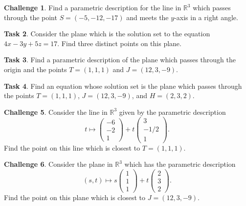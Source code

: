 \documentclass{tufte-book}
\theoremstyle{definition}
\newtheorem{task}{Task}
\newtheorem{challenge}[task]{Challenge}
\begin{document}
\begin{challenge}
Find a parametric description for the line in $\mathbb{R}^3$ which passes through the point $S = (-5,-12,-17)$ and meets the $y$-axis in a right angle.
\end{challenge}

\begin{task}
Consider the plane which is the solution set to the equation
$4x-3y+5z=17$. Find three distinct points on this plane.
\end{task}


\begin{task}
Find a parametric description of the plane which passes through the origin and the points $T = (1,1,1)$ and $J = (12,3,-9)$.
\end{task}


\begin{task}
Find an equation whose solution set is the plane which passes through the points $T = (1,1,1)$, $J = (12,3,-9)$, and $H = (2,3,2)$.
\end{task}


\begin{challenge}
Consider the line in $\mathbb{R}^3$ given by the parametric description
\[
t \mapsto \begin{pmatrix} -6\\-2\\1 \end{pmatrix} + t \begin{pmatrix} 3\\-1/2\\1\end{pmatrix}.
\]
Find the point on this line which is closest to $T = (1,1,1)$.
\end{challenge}


\begin{challenge}
Consider the plane in $\mathbb{R}^3$ which has the parametric description
\[
(s,t) \mapsto s\begin{pmatrix} 1\\1\\1\end{pmatrix} + t \begin{pmatrix} 2\\3\\2\end{pmatrix}. 
\]
Find the point on this plane which is closest to $J = (12,3,-9)$.
\end{challenge}
\end{document}
